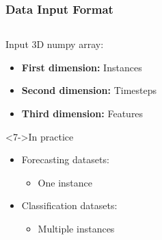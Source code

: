 \documentclass[t,english]{beamer}
\begin{document}
\begin{frame}
  \frametitle{Data Input Format}

  \begin{columns}
    \begin{column}{0.6\textwidth}
      \begin{block}{Input 3D numpy array:}
        \begin{itemize}
          \item<2-> \textbf{First dimension:} Instances
          \item<3-> \textbf{Second dimension:} Timesteps
          \item<4-> \textbf{Third dimension:} Features
        \end{itemize}
      \end{block}

      \begin{block}<7->{In practice}
        \begin{itemize}
          \item<7-> Forecasting datasets:
                \begin{itemize}
                  \item<7-> One instance
                \end{itemize}
          \item<8-> Classification datasets:
                \begin{itemize}
                  \item<8-> Multiple instances
                \end{itemize}
        \end{itemize}
      \end{block}
    \end{column}


\end{columns}
\end{frame}
\end{document}
